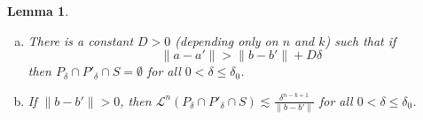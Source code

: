 \documentclass[a4paper]{amsart}
\newtheorem{lemma}[theorem]{Lemma}
\theoremstyle{definition} \newtheorem{remark}[theorem]{Remark}
\def\de{\delta}
\def\leb{\mathcal{L}}
\def\lkb{\lesssim}
\begin{document}
\begin{lemma}
\label{code}
\begin{enumerate}[(a)]

\item
\label{empty}
There is a constant $D>0$ (depending only on $n$ and $k$) such that if $$\| a-a' \|  > \| b - b' \| + D \de $$
then $P_{\de} \cap P'_{\de} \cap S = \emptyset$ for all $0 < \de \leq \de_0$. 

\item
\label{small}
If $\|b-b'\| >0$, %
then $\leb^n(P_{\de} \cap P'_{\de} \cap S) \lkb \frac{\de^{n-k+1}}{\|b-b'\|}$ for all $0 < \de \leq \de_0$.

\end{enumerate}
\end{lemma}
\end{document}
